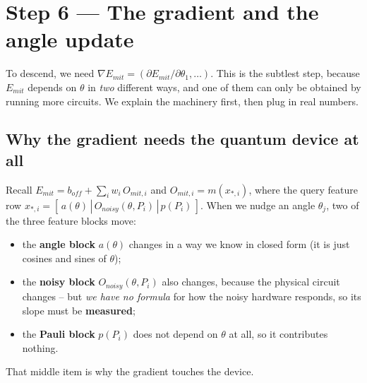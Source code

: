 \documentclass[11pt]{article}
\def\bm#1{#1}%
\def\mathrm#1{#1}%
\newcommand{\Emit}{E_{\mathrm{mit}}}
\newcommand{\boff}{b_{\mathrm{off}}}
\begin{document}
\section{Step 6 --- The gradient and the angle update}
\label{sec:grad}

To descend, we need $\nabla\Emit=(\partial\Emit/\partial\theta_1,\dots)$. This is
the subtlest step, because $\Emit$ depends on $\bm\theta$ in \emph{two} different
ways, and one of them can only be obtained by running more circuits. We explain
the machinery first, then plug in real numbers.

\subsection{Why the gradient needs the quantum device at all}
Recall $\Emit=\boff+\sum_i w_i\,O_{\mathrm{mit},i}$ and
$O_{\mathrm{mit},i}=m(\bm x_{*,i})$, where the query feature row
$\bm x_{*,i}=[\,\bm a(\bm\theta)\,|\,O_{\mathrm{noisy}}(\bm\theta,P_i)\,|\,\bm p(P_i)\,]$.
When we nudge an angle $\theta_j$, two of the three feature blocks move:
\begin{itemize}
  \item the \textbf{angle block} $\bm a(\bm\theta)$ changes in a way we know in
        closed form (it is just cosines and sines of $\bm\theta$);
  \item the \textbf{noisy block} $O_{\mathrm{noisy}}(\bm\theta,P_i)$ also changes,
        because the physical circuit changes -- but \emph{we have no formula} for
        how the noisy hardware responds, so its slope must be \textbf{measured};
  \item the \textbf{Pauli block} $\bm p(P_i)$ does not depend on $\bm\theta$ at
        all, so it contributes nothing.
\end{itemize}
That middle item is why the gradient touches the device.
\end{document}
